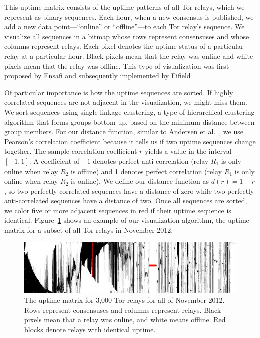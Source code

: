 This uptime matrix consists of the uptime patterns of all Tor relays, which we
represent as binary sequences.  Each hour, when a new consensus is published, we
add a new data point---``online'' or ``offline''---to each Tor relay's sequence.
We visualize all sequences in a bitmap whose rows represent consensuses and
whose columns represent relays.  Each pixel denotes the uptime status of a
particular relay at a particular hour.  Black pixels mean that the relay was
online and white pixels mean that the relay was offline.  This type of
visualization was first proposed by Ensafi and subsequently implemented by
Fifield~\cite{Fifield2014a}.

Of particular importance is how the uptime sequences are sorted.  If highly
correlated sequences are not adjacent in the visualization, we might miss them.
We sort sequences using single-linkage clustering, a type of hierarchical
clustering algorithm that forms groups bottom-up, based on the minimum distance
between group members.  For our distance function, similar to Andersen et
al.~\cite[\S~II.B]{Andersen2002a}, we use Pearson's correlation coefficient
because it tells us if two uptime sequences change together.  The sample
correlation coefficient $r$ yields a value in the interval $[-1, 1]$.  A
coefficient of $-1$ denotes perfect anti-correlation (relay $R_1$ is only
online when relay $R_2$ is offline) and 1 denotes perfect correlation (relay
$R_1$ is only online when relay $R_2$ is online).  We define our distance
function as $d(r) = 1 - r$, so two perfectly correlated sequences have a
distance of zero while two perfectly anti-correlated sequences have a distance
of two.  Once all sequences are sorted, we color five or more adjacent
sequences in red if their uptime sequence is identical.
Figure~\ref{fig:uptime-matrix} shows an example of our visualization algorithm,
the uptime matrix for a subset of all Tor relays in November 2012.

\begin{figure}[t]
	\centering
	\includegraphics[width=\linewidth]{diagrams/2012-11.jpg}
	\caption{The uptime matrix for 3,000 Tor relays for all of November 2012.
	Rows represent consensuses and columns represent relays.  Black pixels mean
	that a relay was online, and white means offline.  Red blocks denote relays
	with identical uptime.}
	\label{fig:uptime-matrix}
\end{figure}

